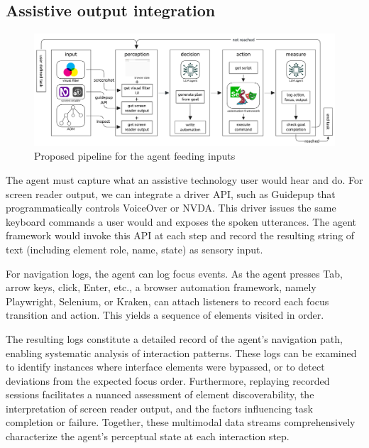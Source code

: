 \subsection{Assistive output integration}

\begin{figure}
    \centering
    \includegraphics[width=1\linewidth]{imgs/flow.png}
    \caption{Proposed pipeline for the agent feeding inputs}
    \vspace{-13pt}
\label{fig:pipeline}
\end{figure}

The agent must capture what an assistive technology user would hear and do. For screen reader output, we can integrate a driver API, such as Guidepup\cite{guidepup2025} that programmatically controls VoiceOver\cite{voiceover2024} or NVDA\cite{nvda2024}.
This driver issues the same keyboard commands a user would and exposes the spoken utterances\cite{guidepup2025}. The agent framework would invoke this API at each step and record the resulting string of text (including element role, name, state) as sensory input.


For navigation logs, the agent can log focus events. As the agent presses Tab, arrow keys, click, Enter, etc., a browser automation framework, namely Playwright\cite{playwright2025}, Selenium\cite{garcia2024selenium}, or Kraken\cite{ravelo2023kraken}, can attach listeners to record each focus transition and action. This yields a sequence of elements visited in order\cite{ravelo2023kraken}. 

The resulting logs constitute a detailed record of the agent's navigation path, enabling systematic analysis of interaction patterns. These logs can be examined to identify instances where interface elements were bypassed, or to detect deviations from the expected focus order. Furthermore, replaying recorded sessions facilitates a nuanced assessment of element discoverability, the interpretation of screen reader output, and the factors influencing task completion or failure. Together, these multimodal data streams comprehensively characterize the agent's perceptual state at each interaction step. 


